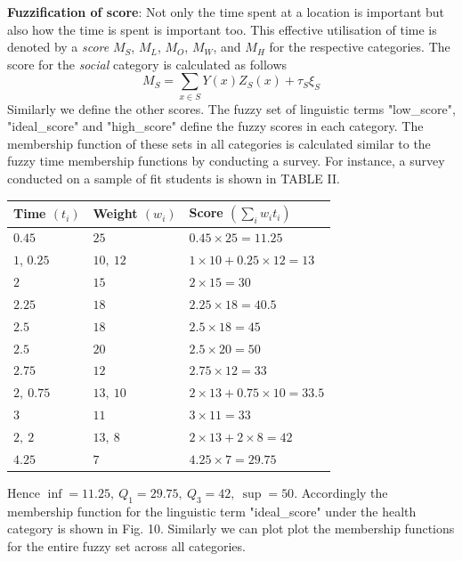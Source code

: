 \documentclass[conference]{IEEEtran}
\begin{document}
\textbf{Fuzzification of score}: Not only the time spent at a location is important but also how the time is spent is important too. This effective utilisation of time is denoted by a \textit{score} $M_S$, $M_L$, $M_O$, $M_W$, and $M_H$ for the respective categories. The score for the \textit{social} category is calculated as follows
\[
M_S = \sum_{x \in S} Y(x)Z_S(x) + \tau_S\xi_S
\]
Similarly we define the other scores. The fuzzy set of linguistic terms "low\_score", "ideal\_score" and "high\_score" define the fuzzy scores in each category. The membership function of these sets in all categories is calculated similar to the fuzzy time membership functions by conducting a survey. For instance, a survey conducted on a sample of fit students is shown in TABLE II.
\begin{table}
\small
{}
\begin{center}
\def\arraystretch{1.7}
\begin{tabular}{| l | l | l |}
\hline
\bf Time $(t_i)$ & \bf Weight $(w_i)$ & \bf Score $(\sum_{i} w_it_i)$ \\
\hline
$0.45$ & $25$ & $0.45\times 25=11.25$ \\
\hline
$1$, $0.25$ & $10,\ 12$ & $1\times10+0.25\times 12=13$ \\
\hline
$2$ & $15$ & $2\times 15=30$ \\
\hline
$2.25$ & $18$ & $2.25\times 18=40.5$ \\
\hline
$2.5$ & $18$ & $2.5\times 18=45$ \\
\hline
$2.5$ & $20$ & $2.5\times 20=50$ \\
\hline
$2.75$ & $12$ & $2.75\times 12=33$ \\
\hline
$2,\ 0.75$ & $13,\ 10$ & $2\times 13+0.75\times 10=33.5$ \\
\hline
$3$ & $11$ & $3\times 11=33$ \\
\hline
$2,\ 2$ & $13,\ 8$ & $2\times 13+2\times 8=42$ \\
\hline
$4.25$ & $7$ & $4.25\times 7 =29.75$ \\
\hline
\end{tabular}
\end{center}
\end{table}
Hence $\inf = 11.25,\ Q_1=29.75,\ Q_3=42,\ \sup = 50$.  Accordingly the membership function for the linguistic term "ideal\_score" under the health category is shown in Fig. 10. Similarly we can plot plot the membership functions for the entire fuzzy set across all categories.
\end{document}
